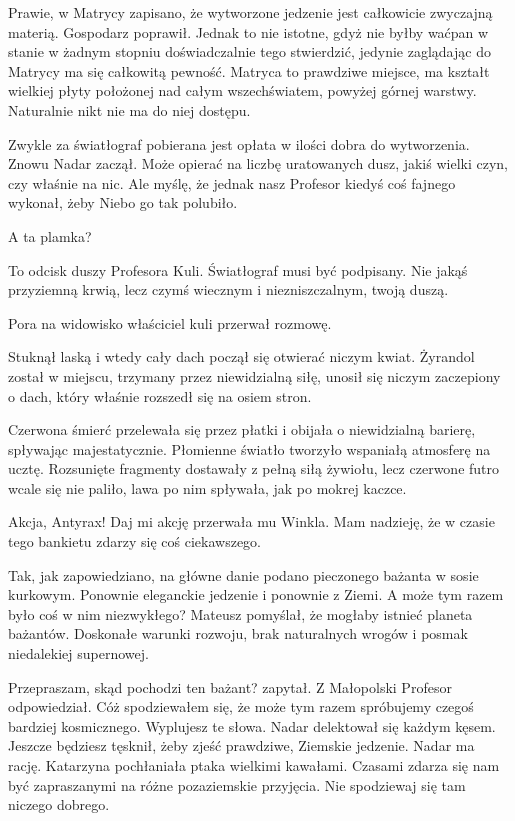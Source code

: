 \ds{} Prawie, w Matrycy zapisano, że wytworzone jedzenie jest całkowicie zwyczajną materią. \dm{} Gospodarz poprawił. \dm{}
Jednak to nie istotne, gdyż nie byłby waćpan w stanie w żadnym stopniu doświadczalnie tego stwierdzić, jedynie zaglądając do Matrycy ma się całkowitą pewność. 
Matryca to prawdziwe miejsce, ma kształt wielkiej płyty położonej nad całym wszechświatem, powyżej górnej warstwy. Naturalnie nikt nie ma do niej
dostępu. \de{}

\ds{} Zwykle za światłograf pobierana jest opłata w ilości dobra do wytworzenia. \dm{} Znowu Nadar zaczął. \dm{} Może opierać na liczbę uratowanych dusz, 
jakiś wielki czyn, czy właśnie na nic. Ale myślę, że jednak nasz Profesor kiedyś coś fajnego wykonał, żeby Niebo go tak polubiło. \de{}

\ds{} A ta plamka? \de{}

\ds{} To odcisk duszy Profesora Kuli. Światłograf musi być podpisany. Nie jakąś przyziemną krwią, lecz czymś wiecznym i niezniszczalnym, twoją duszą. \de{}

\ds{} Pora na widowisko \dm{} właściciel kuli przerwał rozmowę. \de{}

Stuknął laską i wtedy cały dach począł się otwierać niczym kwiat. 
Żyrandol został w miejscu, trzymany przez niewidzialną siłę, unosił się niczym zaczepiony o dach, który właśnie rozszedł się na osiem stron. 

Czerwona śmierć przelewała się przez płatki i obijała o niewidzialną barierę, spływając majestatycznie.
Płomienne światło tworzyło wspaniałą atmosferę na ucztę.
Rozsunięte fragmenty dostawały z pełną siłą żywiołu, lecz czerwone futro wcale się nie paliło, lawa po nim spływała, jak po mokrej kaczce.

\divider{} 

\begin{dialogue}
\ds{} Akcja, Antyrax! Daj mi akcję \dm{} przerwała mu Winkla. \dm{} Mam nadzieję, że w czasie tego bankietu zdarzy się coś ciekawszego.
\end{dialogue}

\divider{}

Tak, jak zapowiedziano, na główne danie podano pieczonego bażanta w sosie kurkowym. 
Ponownie eleganckie jedzenie i ponownie z Ziemi. A może tym razem było coś w nim niezwykłego? Mateusz pomyślał, że mogłaby istnieć planeta bażantów. Doskonałe warunki rozwoju, brak naturalnych wrogów i posmak niedalekiej supernowej.
\begin{dialogue}
\ds{} Przepraszam, skąd pochodzi ten bażant? \dm{} zapytał.
\ds{} Z Małopolski \dm{} Profesor odpowiedział.
\ds{} Cóż spodziewałem się, że może tym razem spróbujemy czegoś bardziej kosmicznego.
\ds{} Wyplujesz te słowa. \dm{} Nadar delektował się każdym kęsem. \dm{} Jeszcze będziesz tęsknił, żeby zjeść prawdziwe, Ziemskie jedzenie. 
\ds{} Nadar ma rację. \dm{} Katarzyna pochłaniała ptaka wielkimi kawałami. \dm{} Czasami zdarza się nam być zapraszanymi na różne pozaziemskie przyjęcia. Nie spodziewaj się tam niczego dobrego.
\end{dialogue}

